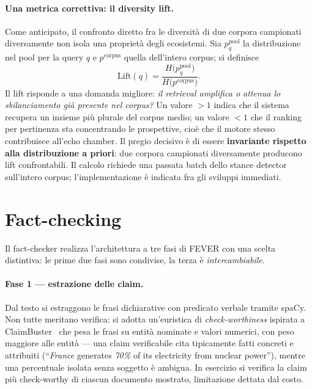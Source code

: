 \documentclass[11pt,a4paper]{report}
\begin{document}
\paragraph{Una metrica correttiva: il diversity lift.}\label{sec:lift}
Come anticipato, il confronto diretto fra le diversità di due corpora campionati diversamente non
isola una proprietà degli ecosistemi. Sia $p^{\text{pool}}_q$ la distribuzione nel pool per la
query $q$ e $p^{\text{corpus}}$ quella dell'intero corpus; si definisce
\begin{equation}\label{eq:lift}
\text{Lift}(q) = \frac{H\bigl(p^{\text{pool}}_q\bigr)}{H\bigl(p^{\text{corpus}}\bigr)} .
\end{equation}
Il lift risponde a una domanda migliore: \emph{il retrieval amplifica o attenua lo sbilanciamento
già presente nel corpus?} Un valore $>1$ indica che il sistema recupera un insieme più plurale del
corpus medio; un valore $<1$ che il ranking per pertinenza sta concentrando le prospettive, cioè
che il motore stesso contribuisce all'echo chamber. Il pregio decisivo è di essere
\textbf{invariante rispetto alla distribuzione a priori}: due corpora campionati diversamente
producono lift confrontabili. Il calcolo richiede una passata batch dello stance detector
sull'intero corpus; l'implementazione è indicata fra gli sviluppi immediati.

\section{Fact-checking}\label{sec:metodo-factcheck}
Il fact-checker realizza l'architettura a tre fasi di FEVER con una scelta distintiva: le prime
due fasi sono condivise, la terza è \emph{intercambiabile}.

\paragraph{Fase 1 --- estrazione delle claim.} Dal testo si estraggono le frasi dichiarative con
predicato verbale tramite spaCy. Non tutte meritano verifica: si adotta un'euristica di
\emph{check-worthiness} ispirata a ClaimBuster~\cite{claimbuster} che pesa le frasi su entità
nominate e valori numerici, con peso maggiore alle entità --- una claim verificabile cita
tipicamente fatti concreti e attribuiti (``\emph{France} generates \emph{70\%} of its electricity
from nuclear power''), mentre una percentuale isolata senza soggetto è ambigua. In esercizio si
verifica la claim più check-worthy di ciascun documento mostrato, limitazione dettata dal costo.
\end{document}
